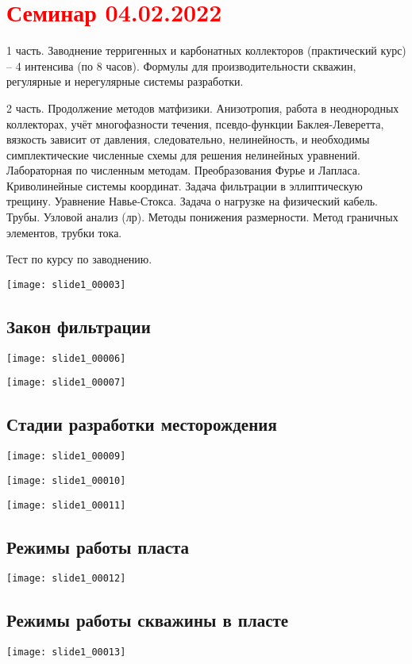 \documentclass[main.tex]{subfiles}
\begin{document}
\section{\textcolor{red}{Семинар 04.02.2022}}

1 часть. Заводнение терригенных и карбонатных коллекторов (практический курс) -- 4 интенсива (по 8 часов). Формулы для производительности скважин, регулярные и нерегулярные системы разработки.

2 часть. Продолжение методов матфизики. Анизотропия, работа в неоднородных коллекторах, учёт многофазности течения, псевдо-функции Баклея-Леверетта, вязкость зависит от давления, следовательно, нелинейность, и необходимы симплектические численные схемы для решения нелинейных уравнений. Лабораторная по численным методам. Преобразования Фурье и Лапласа. Криволинейные системы координат. Задача фильтрации в эллиптическую трещину. Уравнение Навье-Стокса. Задача о нагрузке на физический кабель. Трубы. Узловой анализ (лр). Методы понижения размерности. Метод граничных элементов, трубки тока.

Тест по курсу по заводнению.

\texttt{[image: slide1\_00003]}


\subsection{Закон фильтрации}
\texttt{[image: slide1\_00006]}

\texttt{[image: slide1\_00007]}

\subsection{Стадии разработки месторождения}
\texttt{[image: slide1\_00009]}

\texttt{[image: slide1\_00010]}

\texttt{[image: slide1\_00011]}

\subsection{Режимы работы пласта}
\texttt{[image: slide1\_00012]}


\subsection{Режимы работы скважины в пласте}
\texttt{[image: slide1\_00013]}
\end{document}
